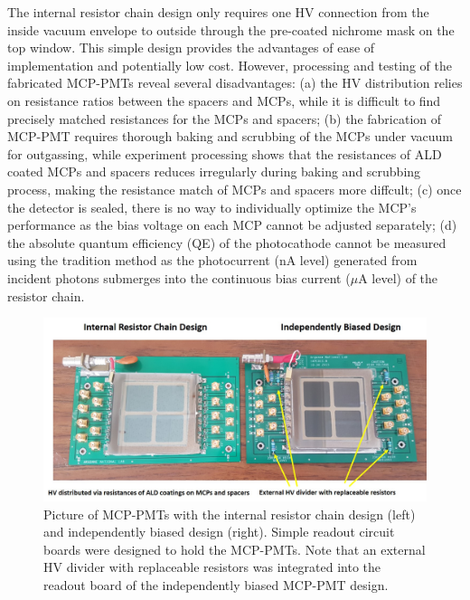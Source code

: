 ﻿\documentclass[preprint,5p]{elsarticle}
\begin{document}
The internal resistor chain design only requires one HV connection from the 
inside vacuum envelope to outside through the pre-coated nichrome mask on the 
top window. This simple design provides the advantages of ease of 
implementation and potentially low cost. However, processing and testing of the 
fabricated MCP-PMTs reveal several disadvantages: (a) the HV distribution 
relies on resistance ratios between the spacers and MCPs, while it is difficult 
to find precisely matched resistances for the MCPs and spacers; (b) the 
fabrication of MCP-PMT requires thorough baking and scrubbing of the MCPs under 
vacuum for outgassing, while experiment processing shows that the resistances 
of ALD coated MCPs and spacers reduces irregularly during baking and scrubbing 
process, making the resistance match of MCPs and spacers more diffcult; (c) once 
the detector is sealed, there is no way to individually optimize the MCP’s 
performance as the bias voltage on each MCP cannot be adjusted separately; (d) 
the absolute quantum efficiency (QE) of the photocathode cannot be measured 
using the tradition method as the photocurrent (nA level) generated from 
incident photons submerges into the continuous bias current ($\mu$A level) of 
the resistor chain.      

\begin{figure}[tbp]
\centering \includegraphics[scale=0.7]{fig/Figure2.jpg}
 \caption{Picture of MCP-PMTs with the internal resistor chain design (left) 
   and independently biased design (right). Simple readout circuit boards were 
   designed to hold the MCP-PMTs. Note that an external HV divider with 
   replaceable resistors was integrated into the readout board of the 
   independently biased MCP-PMT design. } \label{fig:design}
\end{figure}
\end{document}
